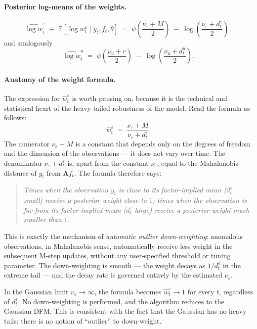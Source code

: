 \documentclass[11pt, a4paper, oneside]{article}
\newcommand{\mL}{\boldsymbol{\Lambda}}
\begin{document}
\paragraph{Posterior log-means of the weights.}
\begin{equation}
\boxed{\;\;
\widehat{\log w}^\varepsilon_t \;\equiv\; \mathbb{E}[\log w^\varepsilon_t \mid y_t, f_t, \theta] \;=\;
\psi\!\left(\frac{\nu_\varepsilon + M}{2}\right) \;-\; \log\!\left(\frac{\nu_\varepsilon + d^\varepsilon_t}{2}\right),
\;\;}
\label{eq:log-w-hat-eps}
\end{equation}
and analogously
\begin{equation}
\boxed{\;\;
\widehat{\log w}^u_t \;=\;
\psi\!\left(\frac{\nu_u + r}{2}\right) \;-\; \log\!\left(\frac{\nu_u + d^u_t}{2}\right).
\;\;}
\label{eq:log-w-hat-u}
\end{equation}

\paragraph{Anatomy of the weight formula.}
The expression for $\hat{w}^\varepsilon_t$ is worth pausing on, because
it is the technical and statistical heart of the heavy-tailed
robustness of the model. Read the formula as follows:
\[
\hat{w}^\varepsilon_t \;=\; \frac{\nu_\varepsilon + M}{\nu_\varepsilon + d^\varepsilon_t}.
\]
The numerator $\nu_\varepsilon + M$ is a constant that depends only on
the degrees of freedom and the dimension of the observations — it does
not vary over time. The denominator $\nu_\varepsilon + d^\varepsilon_t$
is, apart from the constant $\nu_\varepsilon$, equal to the Mahalanobis
distance of $y_t$ from $\mL f_t$. The formula therefore says:
\begin{quote}
\emph{Times when the observation $y_t$ is close to its factor-implied
mean ($d^\varepsilon_t$ small) receive a posterior weight close to $1$;
times when the observation is far from its factor-implied mean
($d^\varepsilon_t$ large) receive a posterior weight much smaller than
$1$.}
\end{quote}
This is exactly the mechanism of \emph{automatic outlier
down-weighting}: anomalous observations, in Mahalanobis sense,
automatically receive less weight in the subsequent M-step updates,
without any user-specified threshold or tuning parameter. The
down-weighting is smooth — the weight decays as
$1/d^\varepsilon_t$ in the extreme tail — and the decay rate is
governed entirely by the estimated $\nu_\varepsilon$.

In the Gaussian limit $\nu_\varepsilon \to \infty$, the formula becomes
$\hat{w}^\varepsilon_t \to 1$ for every $t$, regardless of
$d^\varepsilon_t$. No down-weighting is performed, and the algorithm
reduces to the Gaussian DFM. This is consistent with the fact that the
Gaussian has no heavy tails: there is no notion of ``outlier'' to
down-weight.
\end{document}

